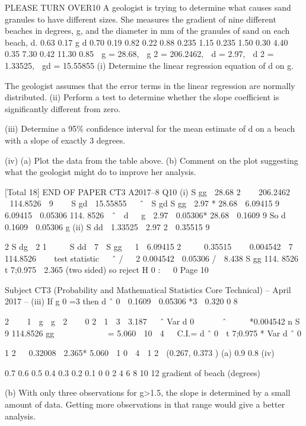 \documentclass[a4paper,12pt]{article}
\begin{document}
\begin{enumerate}
PLEASE TURN OVER10
A geologist is trying to determine what causes sand granules to have different sizes.
She measures the gradient of nine different beaches in degrees, g, and the diameter in
mm of the granules of sand on each beach, d.
0.63
0.17
g
d
0.70
0.19
0.82
0.22
0.88
0.235
1.15
0.235
1.50
0.30
4.40
0.35
7.30
0.42
11.30
0.85
 g = 28.68,  g 2 = 206.2462,  d = 2.97,  d 2 = 1.33525,  gd = 15.55855
(i)
Determine the linear regression equation of d on g.

The geologist assumes that the error terms in the linear regression are normally
distributed.
(ii)
Perform a test to determine whether the slope coefficient is significantly
different from zero.

(iii) Determine a 95\% confidence interval for the mean estimate of d on a beach
with a slope of exactly 3 degrees.

(iv) (a)
Plot the data from the table above.
(b)
Comment on the plot suggesting what the geologist might do to
improve her analysis.

[Total 18]
END OF PAPER
CT3 A2017–8
Q10
(i)
S gg

28.68 2 
  206.2462 
  114.8526

9  

S gd  15.55855 
 ˆ 
S gd
S gg

2.97 * 28.68
 6.09415
9
6.09415
 0.05306
114. 8526
 ˆ  d   g 
2.97  0.05306* 28.68
 0.1609
9
So d  0.1609  0.05306 g
(ii)
S dd  1.33525 
2.97 2
 0.35515
9





2
S dg
 2 1 
   S dd 
7 
S gg
  1 
6.09415 2 
   0.35515 
  0.004542
 7  
114.8526  
 
test statistic   ˆ / 
 2
0.004542
 0.05306 /
 8.438
S gg
114. 8526 
t 7;0.975  2.365 (two sided) so reject H 0 :   0
Page 10

Subject CT3 (Probability and Mathematical Statistics Core Technical) – April 2017 – %
(iii)
If g 0 =3 then d ˆ 0  0.1609  0.05306 *3  0.320 0 8

2 
  1  g  g  2  

0
2  1  3  3.187  
ˆ
Var d 0   
  ˆ   
 *0.004542
n
S
9
114.8526
gg
 
 
 
 
 
= 5.060  10  4
 
C.I.= d ˆ 0  t 7;0.975 * Var d ˆ 0

1
2

 0.32008  2.365* 5.060  1 0  4

1
2
 (0.267, 0.373 )
(a)
0.9
0.8
(iv)

0.7
0.6
0.5
0.4
0.3
0.2
0.1
0
0
2
4
6
8
10
12
gradient of beach (degrees)

(b)
With only three observations for g>1.5, the slope is determined by a
small amount of data. Getting more observations in that range would
give a better analysis.


\end{enumerate}
\end{document}
